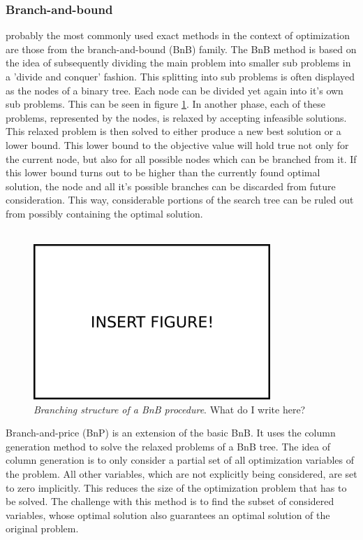 \subsubsection{Branch-and-bound}
probably the most commonly used exact methods in the context of optimization are those from the branch-and-bound (BnB) family. The BnB method is based on the idea of subsequently dividing the main problem into smaller sub problems in a 'divide and conquer' fashion. This splitting into sub problems is often displayed as the nodes of a binary tree. Each node can be divided yet again into it's own sub problems. This can be seen in figure \ref{fig:bnb}. In another phase, each of these problems, represented by the nodes, is relaxed by accepting infeasible solutions. This relaxed problem is then solved to either produce a new best solution or a lower bound. This lower bound to the objective value will hold true not only for the current node, but also for all possible nodes which can be branched from it. If this lower bound turns out to be higher than the currently found optimal solution, the node and all it's possible branches can be discarded from future consideration. This way, considerable portions of the search tree can be ruled out from possibly containing the optimal solution.\\ \\
\begin{figure}
\centering
\includegraphics[width=0.8\textwidth]{img/insert_figure_here.png}
\caption[Branching structure of a BnB procedure]{\label{fig:bnb} \textit{Branching structure of a BnB procedure}. What do I write here?}
\end{figure}
Branch-and-price (BnP) is an extension of the basic BnB. It uses the column generation method to solve the relaxed problems of a BnB tree. The idea of column generation is to only consider a partial set of all optimization variables of the problem. All other variables, which are not explicitly being considered, are set to zero implicitly. This reduces the size of the optimization problem that has to be solved. The challenge with this method is to find the subset of considered variables, whose optimal solution also guarantees an optimal solution of the original problem.\\
